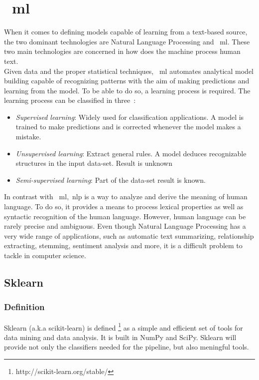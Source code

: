 \section{~\acl{ml}}
When it comes to defining models capable of learning from a text-based source, the two dominant technologies are Natural Language Processing and ~\ac{ml}. These two main technologies are concerned in how does the machine process human text. \\
Given data and the proper statistical techniques, ~\ac{ml} automates analytical model building capable of recognizing patterns with the aim of making predictions and learning from the model. To be able to do so, a learning process is required. The learning process can be classified in three~\cite{mltypes}:
\begin{itemize}
	\item \textit{Supervised learning}: Widely used for classification applications. A model is trained to make predictions and is corrected whenever the model makes a mistake.
	\item \textit{Unsupervised learning}: Extract general rules. A model deduces recognizable structures in the input data-set. Result is unknown  
	\item \textit{Semi-supervised learning}: Part of the data-set result is known. 
\end{itemize} 

In contrast with ~\ac{ml},~\ac{nlp} is a way to analyze and derive the meaning of human language. To do so, it provides a means to process lexical properties as well as syntactic recognition of the human language. However, human language can be rarely precise and ambiguous. Even though Natural Language Processing has a very wide range of applications, such as automatic text summarizing, relationship extracting, stemming, sentiment analysis and more, it is a difficult problem to tackle in computer science.

\subsection{Sklearn}
\subsubsection{Definition}
Sklearn (a.k.a scikit-learn) is defined \footnote{http://scikit-learn.org/stable/} as a simple and efficient set of tools for data mining and data analysis. It is built in NumPy and SciPy. Sklearn will provide not only the classifiers needed for the pipeline, but also meningful tools.
